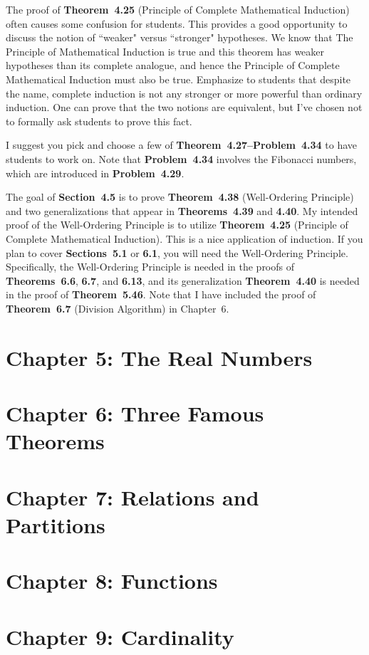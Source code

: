 \documentclass[11pt]{article}%
\newcommand{\blankline}{\pagebreak[2]\vspace{.5\baselineskip}}
\begin{document}
\blankline

The proof of \textbf{Theorem~4.25} (Principle of Complete Mathematical Induction) often causes some confusion for students.  This provides a good opportunity to discuss the notion of ``weaker" versus ``stronger" hypotheses.  We know that The Principle of Mathematical Induction is true and this theorem has weaker hypotheses than its complete analogue, and hence the Principle of Complete Mathematical Induction must also be true.  Emphasize to students that despite the name, complete induction is not any stronger or more powerful than ordinary induction.  One can prove that the two notions are equivalent, but I've chosen not to formally ask students to prove this fact.

\blankline

I suggest you pick and choose a few of \textbf{Theorem~4.27--Problem~4.34} to have students to work on.  Note that \textbf{Problem~4.34} involves the Fibonacci numbers, which are introduced in \textbf{Problem~4.29}.

\blankline

The goal of \textbf{Section~4.5} is to prove \textbf{Theorem~4.38} (Well-Ordering Principle) and two generalizations that appear in \textbf{Theorems~4.39} and \textbf{4.40}. My intended proof of the Well-Ordering Principle is to utilize \textbf{Theorem~4.25} (Principle of Complete Mathematical Induction).  This is a nice application of induction.  If you plan to cover \textbf{Sections~5.1} or \textbf{6.1}, you will need the Well-Ordering Principle.  Specifically, the Well-Ordering Principle is needed in the proofs of \textbf{Theorems~6.6}, \textbf{6.7}, and \textbf{6.13}, and its generalization \textbf{Theorem~4.40} is needed in the proof of \textbf{Theorem~5.46}. Note that I have included the proof of \textbf{Theorem~6.7} (Division Algorithm) in Chapter~6. 


\section*{Chapter 5: The Real Numbers}


\section*{Chapter 6: Three Famous Theorems}


\section*{Chapter 7: Relations and Partitions}


\section*{Chapter 8: Functions}


\section*{Chapter 9: Cardinality}
\end{document}
